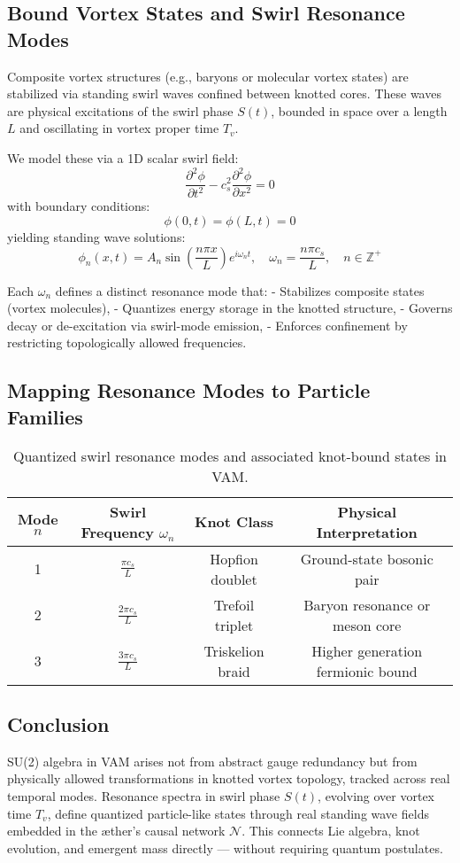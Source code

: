 \subsection*{Bound Vortex States and Swirl Resonance Modes}

Composite vortex structures (e.g., baryons or molecular vortex states) are stabilized via standing swirl waves confined between knotted cores. These waves are physical excitations of the swirl phase \( S(t) \), bounded in space over a length \( L \) and oscillating in vortex proper time \( T_v \).

We model these via a 1D scalar swirl field:
\[
\frac{\partial^2 \phi}{\partial t^2} - c_s^2 \frac{\partial^2 \phi}{\partial x^2} = 0
\]
with boundary conditions:
\[
\phi(0,t) = \phi(L,t) = 0
\]
yielding standing wave solutions:
\[
\phi_n(x,t) = A_n \sin\left( \frac{n\pi x}{L} \right) e^{i \omega_n t}, \quad
\omega_n = \frac{n\pi c_s}{L}, \quad n \in \mathbb{Z}^+
\]

Each \( \omega_n \) defines a distinct resonance mode that:
- Stabilizes composite states (vortex molecules),
- Quantizes energy storage in the knotted structure,
- Governs decay or de-excitation via swirl-mode emission,
- Enforces confinement by restricting topologically allowed frequencies.

\subsection*{Mapping Resonance Modes to Particle Families}

\begin{table}[H]
    \centering
    \footnotesize
    \renewcommand{\arraystretch}{1.4}
    \begin{tabular}{|c|c|c|c|}
        \hline
        \textbf{Mode} \( n \) & \textbf{Swirl Frequency} \( \omega_n \) & \textbf{Knot Class} & \textbf{Physical Interpretation} \\
        \hline
        1 & \( \frac{\pi c_s}{L} \) & Hopfion doublet & Ground-state bosonic pair \\
        2 & \( \frac{2\pi c_s}{L} \) & Trefoil triplet & Baryon resonance or meson core \\
        3 & \( \frac{3\pi c_s}{L} \) & Triskelion braid & Higher generation fermionic bound \\
        \hline
    \end{tabular}
    \caption{Quantized swirl resonance modes and associated knot-bound states in VAM.}
\end{table}

\subsection*{Conclusion}

SU(2) algebra in VAM arises not from abstract gauge redundancy but from physically allowed transformations in knotted vortex topology, tracked across real temporal modes. Resonance spectra in swirl phase \( S(t) \), evolving over vortex time \( T_v \), define quantized particle-like states through real standing wave fields embedded in the æther’s causal network \( \mathcal{N} \). This connects Lie algebra, knot evolution, and emergent mass directly — without requiring quantum postulates.
